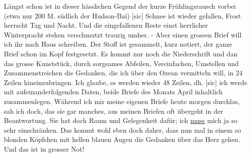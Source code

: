 \def\day{29. M\"{a}z 1943}
\mktitle

L\"{a}ngst schon ist in dieser h\"{a}sslichen Gegend der kurze Fr\"{u}hlingsrausch vorbei (etwa nur 200 M. s\"{u}dlich der Hudson-Bai) {\color{red} [sic] }
Schnee ist wieder gefallen, Frost herrscht Tag und Nacht.
Und die eingefallenen Reste einst herrlicher Winterpracht stehen verschmutzt traurig umher.
- Aber einen grossen Brief will ich ihr nach Haus schreiben.
Der Stoff ist gesammelt, kurz notiert, der ganze Brief schon im Kopf festgesetzt.
Es kommt nur noch die Niederschrift und dan das grosse Kunstst\"{u}ck, durch sorgsames Abfeilen, Vereinfachen, Umstellen und Zusammenstreichen die Gedanken, die ich \"{u}ber den Ozean vermitteln will, in 24 Zeilen hineinzubringen.
Ich glaube, es werden wieder 48 Zeilen, dh.{\color{red} [sic] } ich werde mit aufeinanderfolgenden Daten, beide Briefe des Monats April inhaltlich zusammenlegen.
W\"{a}hrend ich mir meine eigenen Briefe heute morgen durchlas, sah ich doch, das sie gar manches, aus meinen Briefen oft \"{u}bergeht in der Beantwortung.
Sie hat doch Raum und Gelegenheit daf\"{u}r; ich \ul{muss} mich ja so sehr einschr\"{a}nken.
Das kommt wohl eben doch daher, dass nun mal in einem so blonden K\"{o}pfchen mit hellen blauen Augen die Gedanken \"{u}ber das Herz gehen.
Und das ist in grosser Not!
\clearpage

